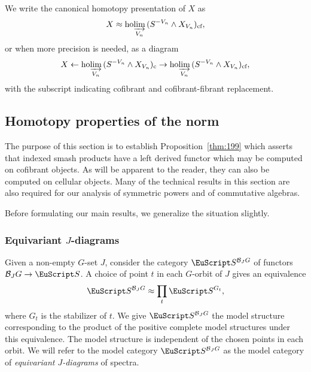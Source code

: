 \documentclass{amsart}
\theoremstyle{definition}
\theoremstyle{remark}
\newcommand{\spectra}{\EuScript S}
\DeclareMathOperator{\ho}{ho}
\newcommand{\ugspectra}[1]{\spectra^{#1}}
\newcommand{\hocolim}{\ho\!\varinjlim}
\newcommand{\cat}[1]{{\mathcal #1}}
\begin{document}
We write the canonical homotopy presentation of $X$ as 
\[
X\approx\hocolim_{V_{n}}\,(S^{-V_{n}}\wedge X_{V_{n}})_{\text{cf}},
\]
or when more precision is needed, as a diagram 
\[
X\leftarrow \hocolim_{V_{n}}\,(S^{-V_{n}}\wedge X_{V_{n}})_{\text{c}}
\to \hocolim_{V_{n}}\,(S^{-V_{n}}\wedge X_{V_{n}})_{\text{cf}},
\]
with the subscript indicating cofibrant and cofibrant-fibrant
replacement.  

\subsection{Homotopy properties of the norm}
\label{sec:homot-prop-norm}
The purpose of this section is to establish Proposition~\ref{thm:199}
which asserts that indexed smash products have a left derived functor
which may be computed on cofibrant objects.  As will be apparent to
the reader, they can also be computed on cellular objects.  Many of
the technical results in this section are also required for our
analysis of symmetric powers and of commutative algebras.

Before formulating our main results, we generalize the situation slightly.

\subsubsection{Equivariant $J$-diagrams}
\label{sec:equiv-j-diagr}
Given a non-empty $G$-set $J$, consider the category
$\spectra^{\cat{B}_{J}G}$ of functors $\cat B_{J}G\to \spectra$.  A
choice of point $t$ in each $G$-orbit of $J$ gives an equivalence
\[
\spectra^{\cat{B}_{J}G} \approx \prod_{t}\ugspectra{G_{t}},
\]
where $G_{t}$ is the stabilizer of $t$.  We give
$\spectra^{\cat{B}_{J}G}$ the model structure corresponding to the
product of the positive complete model structures under this
equivalence.  The model structure is independent of the chosen points
in each orbit.  We will refer to the model category
$\spectra^{\cat{B}_{J}G}$ as the model category of {\em equivariant
$J$-diagrams} of spectra.
\end{document}
